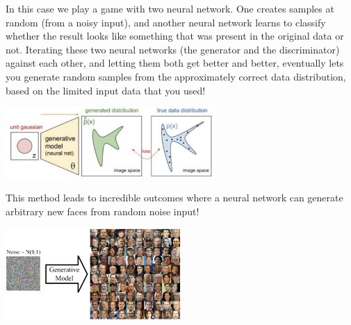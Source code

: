 \documentclass{article}
\begin{document}
\begin{spexample}
    In this case we play a game with two neural network. One creates samples at random (from a noisy input), and another neural network learns to classify whether the result looks like something that was present in the original data or not. Iterating these two neural networks (the generator and the discriminator) against each other, and letting them both get better and better, eventually lets you generate random samples from the approximately correct data distribution, based on the limited input data that you used!
    \begin{center}\includegraphics[width=0.6\textwidth]{Generativemodel.png}\end{center}
    This method leads to incredible outcomes where a neural network can generate arbitrary new faces from random noise input!
    \begin{center}\includegraphics[width=0.5\textwidth]{GAN_4.png}\end{center}
\end{spexample}
\end{document}
